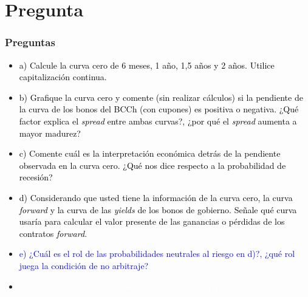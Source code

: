 \documentclass{beamer}
\begin{document}
\section{Pregunta }
\begin{frame}
  \frametitle{Preguntas}
  \begin{itemize}
    \scriptsize
    \item {\textcolor{black}{a) Calcule la curva cero de 6 meses, 1 año, 1,5 años y 2 años. Utilice capitalización continua.}}
    \vspace{3pt}
    \item {\textcolor{black}{b) Grafique la curva cero y comente (sin realizar cálculos) si la pendiente de la curva de los bonos del BCCh (con cupones) es positiva o negativa. ¿Qué factor explica el \textit{spread} entre ambas curvas?, ¿por qué el \textit{spread} aumenta a mayor madurez?}}
    \vspace{3pt}
    \item {\textcolor{black}{c) Comente cuál es la interpretación económica detrás de la pendiente observada en la curva cero. ¿Qué nos dice respecto a la probabilidad de recesión?}}
    \vspace{3pt}
    \item {\textcolor{black}{d) Considerando que usted tiene la información de la curva cero, la curva \textit{forward} y la curva de las \textit{yields} de los bonos de gobierno. Señale qué curva usaría para calcular el valor presente de las ganancias o pérdidas de los contratos \textit{forward}.}}
    \vspace{3pt}
    \item {\Large\textcolor{blue}{e) ¿Cuál es el rol de las probabilidades neutrales al riesgo en d)?, ¿qué rol juega la condición de no arbitraje?}}
    \vspace{3pt}
    \item {\textcolor{white}{f) Calcule el punto a) utilizando matrices en Excel/R/Phyton.}}
    \vspace{3pt}
  \end{itemize}
\end{frame}
\end{document}
